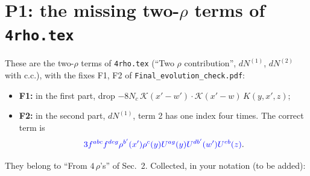 \documentclass[10pt]{article}
\numberwithin{equation}{section}
\newcommand{\new}[1]{{\color{blue}#1}}
\newcommand{\old}[1]{{\color{red}#1}}
\begin{document}
\section{P1: the missing two-\texorpdfstring{$\rho$}{rho} terms of \texttt{4rho.tex}}\label{sec:p1}
These are the two-$\rho$ terms of \texttt{4rho.tex} (``Two $\rho$ contribution'', $dN^{(1)}$, $dN^{(2)}$ with c.c.), with the fixes F1, F2 of \texttt{Final\_evolution\_check.pdf}:
\begin{itemize}
\item \textbf{F1:} in the first part, drop \old{$-8N_c\,\mathcal K(x'-w')\cdot\mathcal K(x'-w)\,K(y,x',z)$};
\item \textbf{F2:} in the second part, $dN^{(1)}$, term 2 has one index four times. The correct term is
\begin{equation*}\new{3f^{abc}f^{deg}\rho^{b'}(x')\rho^c(y)U^{ag}(y)U^{db'}(w')U^{eb}(z)}.\end{equation*}
\end{itemize}
They belong to ``From $4\,\rho$'s'' of Sec.~2. Collected, in your notation (\new{to be added}):
\end{document}
